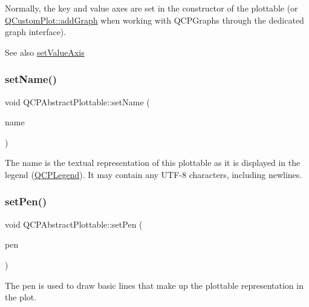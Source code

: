 Normally, the key and value axes are set in the constructor of the plottable (or \mbox{\hyperlink{class_q_custom_plot_a6fb2873d35a8a8089842d81a70a54167}{Q\+Custom\+Plot\+::add\+Graph}} when working with Q\+C\+P\+Graphs through the dedicated graph interface).

\begin{DoxySeeAlso}{See also}
\mbox{\hyperlink{class_q_c_p_abstract_plottable_a71626a07367e241ec62ad2c34baf21cb}{set\+Value\+Axis}} 
\end{DoxySeeAlso}
\mbox{\label{class_q_c_p_abstract_plottable_ab79c7ba76bc7fa89a4b3580e12149f1f}} 
\subsubsection{\texorpdfstring{set\+Name()}{setName()}}
{\footnotesize\ttfamily void Q\+C\+P\+Abstract\+Plottable\+::set\+Name (\begin{DoxyParamCaption}\item[{const Q\+String \&}]{name }\end{DoxyParamCaption})}

The name is the textual representation of this plottable as it is displayed in the legend (\mbox{\hyperlink{class_q_c_p_legend}{Q\+C\+P\+Legend}}). It may contain any U\+T\+F-\/8 characters, including newlines. \mbox{\label{class_q_c_p_abstract_plottable_ab74b09ae4c0e7e13142fe4b5bf46cac7}} 
\subsubsection{\texorpdfstring{set\+Pen()}{setPen()}}
{\footnotesize\ttfamily void Q\+C\+P\+Abstract\+Plottable\+::set\+Pen (\begin{DoxyParamCaption}\item[{const Q\+Pen \&}]{pen }\end{DoxyParamCaption})}

The pen is used to draw basic lines that make up the plottable representation in the plot.

